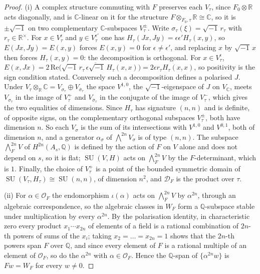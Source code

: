 \documentclass[11pt,reqno]{amsart}
\theoremstyle{plain}
\theoremstyle{definition}
\theoremstyle{remark}
\newcommand{\QQ}{\mathbb{Q}}
\newcommand{\RR}{\mathbb{R}}
\newcommand{\CC}{\mathbb{C}}
\newcommand{\cO}{\mathcal{O}}
\newcommand{\cD}{\mathcal{D}}
\DeclareMathOperator{\SU}{SU}
\newcommand{\bbar}[1]{\overline{#1}}
\begin{document}
\begin{proof}
(i) A complex structure commuting with $F$ preserves each $V_{\tau}$, since
$F_{0}\otimes\RR$ acts diagonally, and is $\CC$-linear on it for the
structure $F\otimes_{F_{0},\tau}\RR\cong\CC$, so it is $\pm\sqrt{-1}$ on two
complementary $\CC$-subspaces $V_{\tau}^{\pm}$. Write
$\sigma_{\tau}(\xi)=\sqrt{-1}\,r_{\tau}$ with $r_{\tau}\in\RR^{\times}$. For
$x\in V^{\epsilon}_{\tau}$ and $y\in V^{\epsilon'}_{\tau}$ one has
$H_{\tau}(Jx,Jy)=\epsilon\epsilon'H_{\tau}(x,y)$, so
$E(Jx,Jy)=E(x,y)$ forces $E(x,y)=0$ for $\epsilon\ne\epsilon'$, and replacing
$x$ by $\sqrt{-1}\,x$ then forces $H_{\tau}(x,y)=0$: the decomposition is
orthogonal. For $x\in V^{\epsilon}_{\tau}$,
$E(x,Jx)=2\,\mathrm{Re}\bigl(\sqrt{-1}\,r_{\tau}\,
\overline{\epsilon\sqrt{-1}}\,H_{\tau}(x,x)\bigr)=2\epsilon r_{\tau}H_{\tau}(x,x)$,
so positivity is the sign condition stated. Conversely such a decomposition
defines a polarised $J$. Under $V_{\tau}\otimes_{\RR}\CC=V_{\sigma_{\tau}}
\oplus V_{\bbar\sigma_{\tau}}$ the space $V^{1,0}$, the $\sqrt{-1}$-eigenspace
of $J$ on $V_{\CC}$, meets $V_{\sigma_{\tau}}$ in the image of $V_{\tau}^{+}$
and $V_{\bbar\sigma_{\tau}}$ in the conjugate of the image of $V_{\tau}^{-}$,
which gives the two equalities of dimensions. Since $H_{\tau}$ has signature
$(n,n)$ and is definite, of opposite signs, on the complementary orthogonal
subspaces $V_{\tau}^{\pm}$, both have dimension $n$. So each $V_{\sigma}$ is
the sum of its intersections with $V^{1,0}$ and $V^{0,1}$, both of dimension
$n$, and a generator $\alpha_{\sigma}$ of $\bigwedge^{2n}V_{\sigma}$ is of
type $(n,n)$. The subspace $\bigwedge^{2n}_{F}V$ of $H^{2n}(A_{s},\QQ)$ is
defined by the action of $F$ on $V$ alone and does not depend on $s$, so it
is flat; $\SU(V,H)$ acts on $\bigwedge^{2n}_{F}V$ by the $F$-determinant,
which is $1$. Finally, the choice of $V_{\tau}^{+}$ is a point of the bounded
symmetric domain of $\SU(V_{\tau},H_{\tau})\cong\SU(n,n)$, of dimension
$n^{2}$, and $\cD_{F}$ is the product over $\tau$.

(ii) For $\alpha\in\cO_{F}$ the endomorphism $\iota(\alpha)$ acts on
$\bigwedge^{2n}_{F}V$ by $\alpha^{2n}$, through an algebraic correspondence,
so the algebraic classes in $W_{F}$ form a $\QQ$-subspace stable under
multiplication by every $\alpha^{2n}$. By the polarisation identity, in
characteristic zero every product $x_{1}\cdots x_{2n}$ of elements of a field
is a rational combination of $2n$-th powers of sums of the $x_{i}$; taking
$x_{2}=\dots=x_{2n}=1$ shows that the $2n$-th powers span $F$ over $\QQ$, and
since every element of $F$ is a rational multiple of an element of $\cO_{F}$,
so do the $\alpha^{2n}$ with $\alpha\in\cO_{F}$. Hence the $\QQ$-span of
$\{\alpha^{2n}w\}$ is $Fw=W_{F}$ for every $w\ne0$.


\end{proof}
\end{document}
